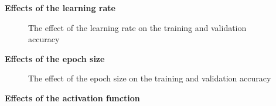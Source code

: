 \documentclass[a4paper]{article}
\begin{document}
\textbf{Effects of the learning rate}

\begin{figure} [htbp]
    \caption{The effect of the learning rate on the training and validation accuracy} 
    \label{fig:mnist_ann_result_learningrate}
\end{figure}

\textbf{Effects of the epoch size}


\begin{figure} [htbp]
    \caption{The effect of the epoch size on the training and validation accuracy} 
    \label{fig:mnist_ann_result_epoch}
\end{figure}

\textbf{Effects of the activation function}
\end{document}
